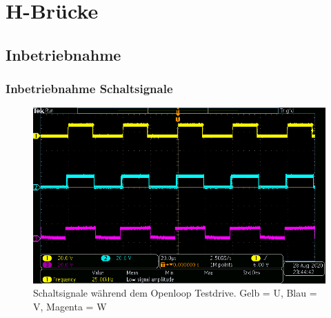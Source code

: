 \section{H-Brücke}\label{Appendix:H_Bruecke}

%


\subsection{Inbetriebnahme}

%


\subsubsection{Inbetriebnahme Schaltsignale}\label{Appendix:H_Bruecke_Schaltsignale}

\begin{figure}[H]
	\centering
	\includegraphics[width=\textwidth]{graphics/OpenLoop_TestDrive2}
	\caption{Schaltsignale während dem Openloop Testdrive. Gelb = U, Blau = V, Magenta = W}
	\label{fig:OpenLoop_TestDrive2}
\end{figure}